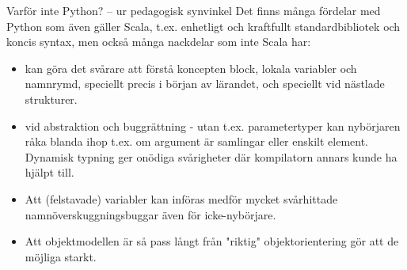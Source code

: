 \begin{Slide}{Varför inte Python? -- ur pedagogisk synvinkel}\SlideFontSmall
Det finns många fördelar med Python som även gäller Scala, t.ex. enhetligt och kraftfullt standardbibliotek och koncis syntax, men också många nackdelar som inte Scala har:
\begin{itemize}
\item {} kan göra det svårare att förstå koncepten block, lokala variabler och namnrymd, speciellt precis i början av lärandet, och speciellt vid nästlade strukturer.
\item {} vid abstraktion och buggrättning - utan t.ex. parametertyper kan nybörjaren råka blanda ihop t.ex. om argument är samlingar eller enskilt element. Dynamisk typning ger onödiga svårigheter där kompilatorn annars kunde ha hjälpt till.
\item Att (felstavade) variabler kan införas  medför mycket svårhittade namnöverskuggningsbuggar även för icke-nybörjare.
\item Att objektmodellen är så pass långt från "riktig" objektorientering gör att de möjliga  starkt.
  \end{itemize}
\end{Slide}


